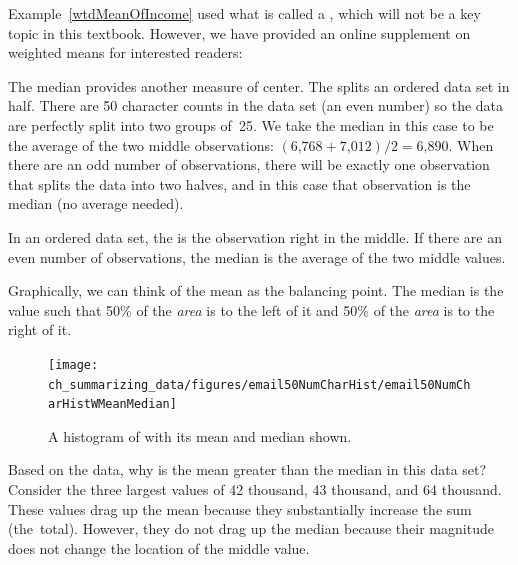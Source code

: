Example~\ref{wtdMeanOfIncome} used what is called a , which will not be a key topic in this textbook. However, we have provided an online supplement on weighted means for interested readers:
\begin{center}
\end{center}

The median provides another measure of center. The  splits an ordered data set in half. There are 50 character counts in the  data set (an even number) so the data are perfectly split into two groups of~25. We take the median in this case to be the average of the two middle observations: $(\text{6,768} + \text{7,012}) / 2 = \text{6,890}$. When there are an odd number of observations, there will be exactly one observation that splits the data into two halves, and in this case that observation is the median (no average needed).

\begin{termBox}{
In an ordered data set, the  is the observation right in the middle. If there are an even number of observations, the median is the average of the two middle values.}
\end{termBox}

Graphically, we can think of the mean as the balancing point. The median is the value such that 50\% of the \emph{area} is to the left of it and 50\% of the \emph{area} is to the right of it.


\begin{figure}[h]
   \centering
   \texttt{[image: ch\_summarizing\_data/figures/email50NumCharHist/email50NumCharHistWMeanMedian]}
   \caption{A histogram of  with its mean and median shown.}
   \label{email50NumCharHistWMeanMedian}
\end{figure}

\begin{example}{Based on the data, why is the mean greater than the median in this data set?}
Consider the three largest values of 42 thousand, 43 thousand, and 64 thousand. These values drag up the mean because they substantially increase the sum (the~total). However, they do not drag up the median because their magnitude does not change the location of the middle value.
\end{example}

